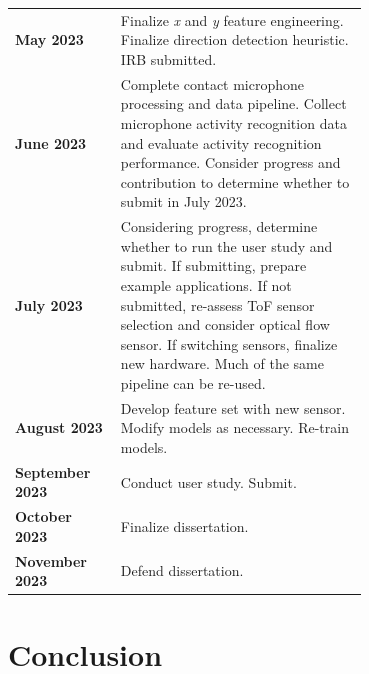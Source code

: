 \documentclass [11pt, proquest] {uwthesis}[2020/02/24]
\begin{document}


\vspace{2em}
\begin{tabular}{@{}lp{0.7\linewidth}@{}}
\textbf{May 2023} & Finalize \textit{x} and \textit{y} feature engineering. Finalize direction detection heuristic. IRB submitted. \\
\textbf{June 2023} & Complete contact microphone processing and data pipeline. Collect microphone activity recognition data and evaluate activity recognition performance. Consider progress and contribution to determine whether to submit in July 2023. \\
\textbf{July 2023} & Considering progress, determine whether to run the user study and submit. If submitting, prepare example applications. If not submitted, re-assess ToF sensor selection and consider optical flow sensor. If switching sensors, finalize new hardware. Much of the same pipeline can be re-used. \\
\textbf{August 2023} & Develop feature set with new sensor. Modify models as necessary. Re-train models. \\
\textbf{September 2023} & Conduct user study. Submit. \\
\textbf{October 2023} & Finalize dissertation. \\
\textbf{November 2023} & Defend dissertation. \\
\end{tabular}




\chapter{Conclusion}
\end{document}
